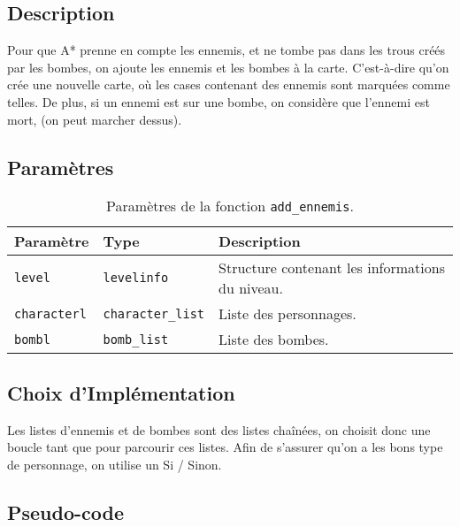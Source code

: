 \subsection{Description}

Pour que A* prenne en compte les ennemis, et ne tombe pas dans les trous créés par les bombes, on ajoute les ennemis et les bombes à la carte.
C'est-à-dire qu'on crée une nouvelle carte, où les cases contenant des ennemis sont marquées comme telles.
De plus, si un ennemi est sur une bombe, on considère que l'ennemi est mort, (on peut marcher dessus).

\subsection{Paramètres}

\begin{table}[!htpb]
    \begin{tabularx}{\textwidth}{lXX}
        \toprule
        \textbf{Paramètre} & \textbf{Type} & \textbf{Description} \\
        \midrule
        \texttt{level} & \texttt{levelinfo} & Structure contenant les informations du niveau. \\
        \texttt{characterl} & \texttt{character\_list} & Liste des personnages. \\
        \texttt{bombl} & \texttt{bomb\_list} & Liste des bombes. \\
        \bottomrule
    \end{tabularx}
    \caption{Paramètres de la fonction \texttt{add\_ennemis}.}
    \label{tab:parameters-add_ennemis}
\end{table}

\subsection{Choix d'Implémentation}

Les listes d'ennemis et de bombes sont des listes chaînées, on choisit donc une boucle tant que pour parcourir ces listes.
Afin de s'assurer qu'on a les bons type de personnage, on utilise un Si / Sinon.

\subsection{Pseudo-code}

